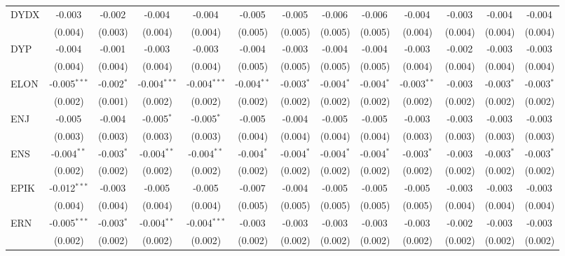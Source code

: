 \begin{table}[!htbp]
\begin{tabular}{@{\extracolsep{5pt}}lcccccccccccc}
 DYDX & -0.003$^{}$ & -0.002$^{}$ & -0.004$^{}$ & -0.004$^{}$ & -0.005$^{}$ & -0.005$^{}$ & -0.006$^{}$ & -0.006$^{}$ & -0.004$^{}$ & -0.003$^{}$ & -0.004$^{}$ & -0.004$^{}$ \\
  & (0.004) & (0.003) & (0.004) & (0.004) & (0.005) & (0.005) & (0.005) & (0.005) & (0.004) & (0.004) & (0.004) & (0.004) \\
 DYP & -0.004$^{}$ & -0.001$^{}$ & -0.003$^{}$ & -0.003$^{}$ & -0.004$^{}$ & -0.003$^{}$ & -0.004$^{}$ & -0.004$^{}$ & -0.003$^{}$ & -0.002$^{}$ & -0.003$^{}$ & -0.003$^{}$ \\
  & (0.004) & (0.004) & (0.004) & (0.004) & (0.005) & (0.005) & (0.005) & (0.005) & (0.004) & (0.004) & (0.004) & (0.004) \\
 ELON & -0.005$^{***}$ & -0.002$^{*}$ & -0.004$^{***}$ & -0.004$^{***}$ & -0.004$^{**}$ & -0.003$^{*}$ & -0.004$^{*}$ & -0.004$^{*}$ & -0.003$^{**}$ & -0.003$^{}$ & -0.003$^{*}$ & -0.003$^{*}$ \\
  & (0.002) & (0.001) & (0.002) & (0.002) & (0.002) & (0.002) & (0.002) & (0.002) & (0.002) & (0.002) & (0.002) & (0.002) \\
 ENJ & -0.005$^{}$ & -0.004$^{}$ & -0.005$^{*}$ & -0.005$^{*}$ & -0.005$^{}$ & -0.004$^{}$ & -0.005$^{}$ & -0.005$^{}$ & -0.003$^{}$ & -0.003$^{}$ & -0.003$^{}$ & -0.003$^{}$ \\
  & (0.003) & (0.003) & (0.003) & (0.003) & (0.004) & (0.004) & (0.004) & (0.004) & (0.003) & (0.003) & (0.003) & (0.003) \\
 ENS & -0.004$^{**}$ & -0.003$^{*}$ & -0.004$^{**}$ & -0.004$^{**}$ & -0.004$^{*}$ & -0.004$^{*}$ & -0.004$^{*}$ & -0.004$^{*}$ & -0.003$^{*}$ & -0.003$^{}$ & -0.003$^{*}$ & -0.003$^{*}$ \\
  & (0.002) & (0.002) & (0.002) & (0.002) & (0.002) & (0.002) & (0.002) & (0.002) & (0.002) & (0.002) & (0.002) & (0.002) \\
 EPIK & -0.012$^{***}$ & -0.003$^{}$ & -0.005$^{}$ & -0.005$^{}$ & -0.007$^{}$ & -0.004$^{}$ & -0.005$^{}$ & -0.005$^{}$ & -0.005$^{}$ & -0.003$^{}$ & -0.003$^{}$ & -0.003$^{}$ \\
  & (0.004) & (0.004) & (0.004) & (0.004) & (0.005) & (0.005) & (0.005) & (0.005) & (0.005) & (0.004) & (0.004) & (0.004) \\
 ERN & -0.005$^{***}$ & -0.003$^{*}$ & -0.004$^{**}$ & -0.004$^{***}$ & -0.003$^{}$ & -0.003$^{}$ & -0.003$^{}$ & -0.003$^{}$ & -0.003$^{}$ & -0.002$^{}$ & -0.003$^{}$ & -0.003$^{}$ \\
  & (0.002) & (0.002) & (0.002) & (0.002) & (0.002) & (0.002) & (0.002) & (0.002) & (0.002) & (0.002) & (0.002) & (0.002) \\

\end{tabular}
\end{table}
